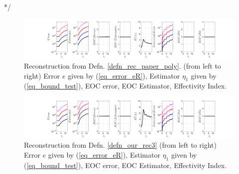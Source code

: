 \documentclass[12pt,a4paper]{article}
\numberwithin{equation}{section}
\theoremstyle{definition}
\begin{document}
*/
\begin{figure}[H]
	\hspace{-3cm}
	\includegraphics[scale=0.55]{fig_LeapFrogplots_1x5_sin_IC_harmonic_u6_v4_paperrec_poly_our_res}	
	\caption{Reconstruction from Defn. \ref{defn_rec_paper_poly}. (from left to right) Error $e$ given by (\ref{eq_error_eR}), Estimator $\eta_1$ given by (\ref{eq_bound_test}), EOC error, EOC Estimator, Effectivity Index.}
	\label{fig_all_in_one_paperrec_poly_u06_v04}
\end{figure}

\begin{figure}[H]
	\hspace{-3cm}
	\includegraphics[scale=0.55]{fig_LeapFrogplots_1x5_sin_IC_harmonic_u6_v4_paperrec_poly_tristan}	
	\caption{Reconstruction from Defn. \ref{defn_our_rec3} (from left to right) Error $e$ given by (\ref{eq_error_eR}), Estimator $\eta_1$ given by (\ref{eq_bound_test}), EOC error, EOC Estimator, Effectivity Index.}
	\label{fig_all_in_one_paperrec_poly_tristan_u6_v4}
\end{figure}
\end{document}
